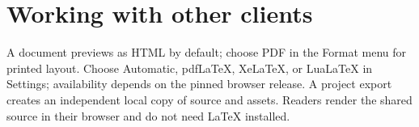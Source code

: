 \documentclass[11pt]{article}
\begin{document}
\section{Working with other clients}

A document previews as HTML by default; choose PDF in the Format menu for printed layout. Choose Automatic, pdfLaTeX, XeLaTeX, or LuaLaTeX in Settings; availability depends on the pinned browser release. A project export creates an independent local copy of source and assets. Readers render the shared source in their browser and do not need \LaTeX{} installed.



\end{document}
